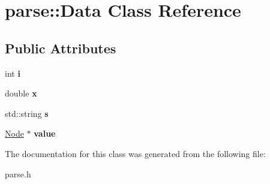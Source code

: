 \hypertarget{classparse_1_1_data}{
\section{parse::Data Class Reference}
\label{classparse_1_1_data}
}
\subsection*{Public Attributes}
\begin{DoxyCompactItemize}
\item 
\hypertarget{classparse_1_1_data_a63cec840a32b4c34f9ae0435b61e30e0}{
int {\bfseries i}}
\label{classparse_1_1_data_a63cec840a32b4c34f9ae0435b61e30e0}

\item 
\hypertarget{classparse_1_1_data_af4a131eb71a7290bf07fb8d8cf6f3b25}{
double {\bfseries x}}
\label{classparse_1_1_data_af4a131eb71a7290bf07fb8d8cf6f3b25}

\item 
\hypertarget{classparse_1_1_data_aff5da6a946ede974df321c10537656a5}{
std::string {\bfseries s}}
\label{classparse_1_1_data_aff5da6a946ede974df321c10537656a5}

\item 
\hypertarget{classparse_1_1_data_a75d7093eefe47e1747f2dde884e78cf6}{
\hyperlink{classparse_1_1_node}{Node} $\ast$ {\bfseries value}}
\label{classparse_1_1_data_a75d7093eefe47e1747f2dde884e78cf6}

\end{DoxyCompactItemize}


The documentation for this class was generated from the following file:\begin{DoxyCompactItemize}
\item 
parse.h\end{DoxyCompactItemize}
